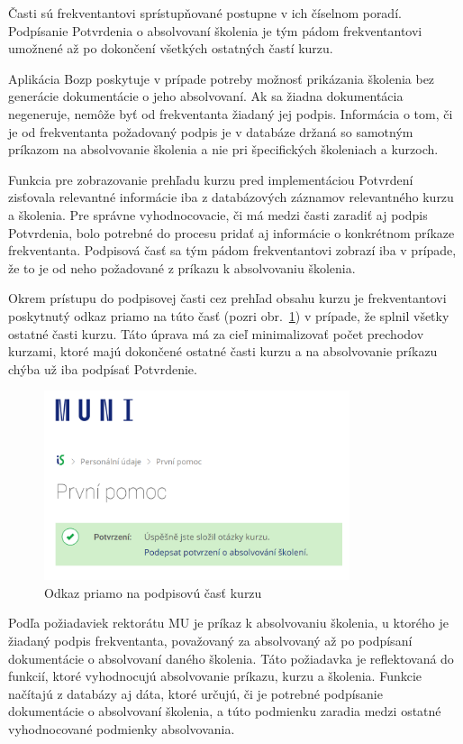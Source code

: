 \documentclass[
  digital,     %
  oneside,     %
  nosansbold,  %
  nocolorbold, %
  lof,         %
  nolot,         %
]{fithesis4}
\begin{document}
\noindent
Časti sú frekventantovi sprístupňované postupne v ich číselnom poradí.
Podpísanie Potvrdenia o absolvovaní školenia je tým pádom frekventantovi umožnené až po dokončení všetkých ostatných častí kurzu.

Aplikácia Bozp poskytuje v prípade potreby možnosť prikázania školenia bez generácie dokumentácie o jeho absolvovaní. Ak sa žiadna dokumentácia negeneruje, nemôže byť od frekventanta žiadaný jej podpis. Informácia o tom, či je od frekventanta požadovaný podpis je v databáze držaná so samotným príkazom na absolvovanie školenia a nie pri špecifických školeniach a kurzoch.

Funkcia pre zobrazovanie prehľadu kurzu pred implementáciou Potvrdení zisťovala relevantné informácie iba z databázových záznamov relevantného kurzu a školenia. Pre správne vyhodnocovacie, či má medzi časti zaradiť aj podpis Potvrdenia, bolo potrebné do procesu pridať aj informácie o konkrétnom príkaze frekventanta. Podpisová časť sa tým pádom frekventantovi zobrazí iba v prípade, že to je od neho požadované z príkazu k absolvovaniu školenia.

Okrem prístupu do podpisovej časti cez prehľad obsahu kurzu je frekventantovi poskytnutý odkaz priamo na túto časť (pozri obr.~\ref{obr2}) v prípade, že splnil všetky ostatné časti kurzu. Táto úprava má za cieľ minimalizovať počet prechodov kurzami, ktoré majú dokončené ostatné časti kurzu a na absolvovanie príkazu chýba už iba podpísať Potvrdenie.

\begin{figure}
  \begin{center}
    \includegraphics[width=0.8\textwidth]{odkaznapodpis.png}
  \end{center}
  \caption{Odkaz priamo na podpisovú časť kurzu}
  \label{obr2}
\end{figure}

Podľa požiadaviek rektorátu MU je príkaz k absolvovaniu školenia, u ktorého je žiadaný podpis frekventanta, považovaný za absolvovaný až po podpísaní dokumentácie o absolvovaní daného školenia. Táto požiadavka je reflektovaná do funkcií, ktoré vyhodnocujú absolvovanie príkazu, kurzu a školenia. Funkcie načítajú z databázy aj dáta, ktoré určujú, či je potrebné podpísanie dokumentácie o absolvovaní školenia, a túto podmienku zaradia medzi ostatné vyhodnocované podmienky absolvovania.
\end{document}
